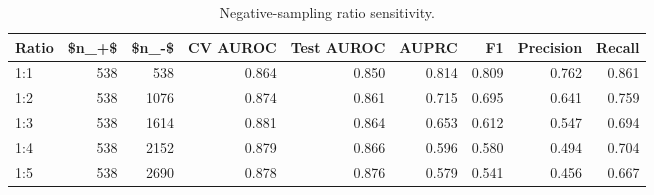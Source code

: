 \begin{table}[htbp]
\centering
\caption{Negative-sampling ratio sensitivity.}
\label{tab:robustness_recomputed}
\begin{tabular}{lrrrrrrrr}
\toprule
Ratio & \$n\_+\$ & \$n\_-\$ & CV AUROC & Test AUROC & AUPRC & F1 & Precision & Recall \\
\midrule
1:1 & 538 & 538 & 0.864 & 0.850 & 0.814 & 0.809 & 0.762 & 0.861 \\
1:2 & 538 & 1076 & 0.874 & 0.861 & 0.715 & 0.695 & 0.641 & 0.759 \\
1:3 & 538 & 1614 & 0.881 & 0.864 & 0.653 & 0.612 & 0.547 & 0.694 \\
1:4 & 538 & 2152 & 0.879 & 0.866 & 0.596 & 0.580 & 0.494 & 0.704 \\
1:5 & 538 & 2690 & 0.878 & 0.876 & 0.579 & 0.541 & 0.456 & 0.667 \\
\bottomrule
\end{tabular}

\end{table}
